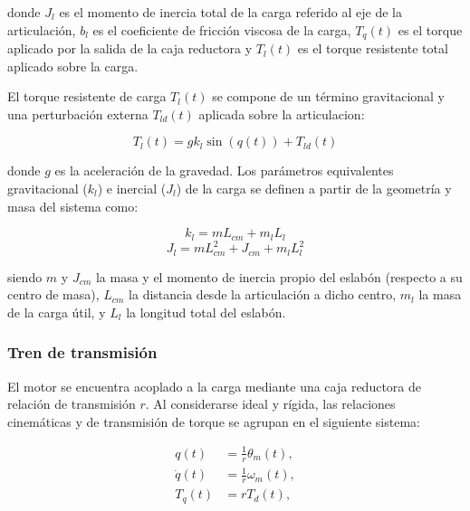 \documentclass[10pt,a4paper]{article}
\begin{document}
donde 
$J_l$ es el momento de inercia total de la carga referido al eje de la articulación, 
\(b_l\) es el coeficiente de fricción viscosa de la carga, 
\(T_q(t)\) es el torque aplicado por la salida de la caja reductora y 
\(T_l(t)\) es el torque resistente total aplicado sobre la carga.

El torque resistente de carga $T_l(t)$ se compone de un término gravitacional y una perturbación externa $T_{ld}(t)$ aplicada sobre la articulacion:

\begin{equation}
    T_l(t) = g k_l \sin(q(t)) + T_{ld}(t)
    \label{eq:torque_carga}
\end{equation}

donde $g$ es la aceleración de la gravedad. Los parámetros equivalentes gravitacional ($k_l$) e inercial ($J_l$) 
de la carga se definen a partir de la geometría y masa del sistema como:

\begin{equation*}
    k_l = m L_{cm} + m_l L_l
\end{equation*}
\begin{equation*}
    J_l = m L_{cm}^{2} + J_{cm} + m_l L_l^{2}
\end{equation*}

siendo $m$ y $J_{cm}$ la masa y el momento de inercia propio del eslabón (respecto a su centro de masa), 
$L_{cm}$ la distancia desde la articulación a dicho centro, 
$m_l$ la masa de la carga útil, 
y $L_l$ la longitud total del eslabón.

\subsubsection{Tren de transmisión}

El motor se encuentra acoplado a la carga mediante una caja reductora de relación de transmisión $r$.
Al considerarse ideal y rígida, las relaciones cinemáticas y de transmisión de torque se agrupan en el siguiente sistema:

\begin{equation}
    \begin{aligned}
        q(t) &= \frac{1}{r}\theta_m(t), \\
        \dot{q}(t) &= \frac{1}{r}\omega_m(t), \\
        T_q(t) &= r T_d(t),
    \end{aligned}
    \label{eq:transmision}
\end{equation}
\end{document}
